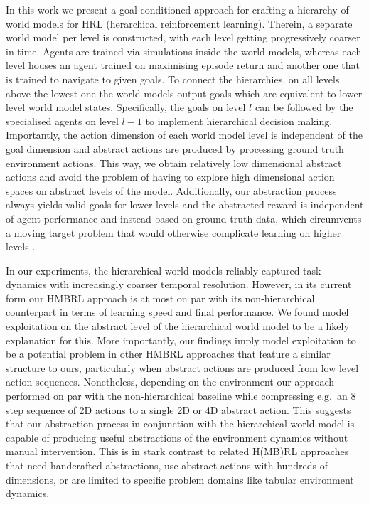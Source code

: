 \documentclass{article}
\begin{document}
In this work we present a goal-conditioned approach for crafting a hierarchy of world models for HRL (herarchical reinforcement learning). Therein, a separate world model per level is constructed, with each level getting progressively coarser in time. Agents are trained via simulations inside the world models, whereas each level houses an agent trained on maximising episode return and another one that is trained to navigate to given goals. To connect the hierarchies, on all levels above the lowest one the world models output goals which are equivalent to lower level world model states. Specifically, the goals on level $l$ can be followed by the specialised agents on level $l-1$ to implement hierarchical decision making. Importantly, the action dimension of each world model level is independent of the goal dimension and abstract actions are produced by processing ground truth environment actions. This way, we obtain relatively low dimensional abstract actions and avoid the problem of having to explore high dimensional action spaces on abstract levels of the model. Additionally, our abstraction process always yields valid goals for lower levels and the abstracted reward is independent of  agent performance and instead based on ground truth data, which circumvents a moving target problem that would otherwise complicate learning on higher levels \citep{vezhnevets2017feudal, nachum2018data}.

In our experiments, the hierarchical world models reliably captured task dynamics with increasingly coarser temporal resolution. However, in its current form our HMBRL approach is at most on par with its non-hierarchical counterpart in terms of learning speed and final performance. We found model exploitation on the abstract level of the hierarchical world model to be a likely explanation for this. More importantly, our findings imply model exploitation to be a potential problem in other HMBRL approaches that feature a similar structure to ours, particularly when abstract actions are produced from low level action sequences. Nonetheless, depending on the environment our approach performed on par with the non-hierarchical baseline while compressing e.g.\ an 8 step sequence of 2D actions to a single 2D or 4D abstract action. This suggests that our abstraction process in conjunction with the hierarchical world model is capable of producing useful abstractions of the environment dynamics without manual intervention. This is in stark contrast to related H(MB)RL approaches that need handcrafted abstractions, use abstract actions with hundreds of dimensions, or are limited to specific problem domains like tabular environment dynamics.
\end{document}
